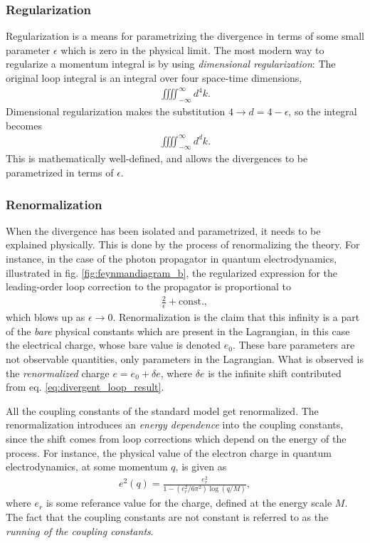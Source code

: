 \documentclass[twoside,english]{uiofysmaster}
\begin{document}
\subsubsection{Regularization}
Regularization is a means for parametrizing the divergence in terms of some small parameter $\epsilon$ which is zero in the physical limit. The most modern way to regularize a momentum integral is by using {\it dimensional regularization}: The original loop integral is an integral over four space-time dimensions, 
\begin{align}
	\iiiint_{-\infty}^\infty d^4 k.
\end{align}
Dimensional regularization makes the substitution $4 \to d = 4-\epsilon$, so the integral becomes
\begin{align}
	\iiiint_{-\infty}^\infty d^d k.
\end{align}
This is mathematically well-defined, and allows the divergences to be parametrized in terms of $\epsilon$.
\subsubsection{Renormalization}
When the divergence has been isolated and parametrized, it needs to be explained physically. This is done by the process of renormalizing the theory. For instance, in the case of the photon propagator in quantum electrodynamics, illustrated in fig. \ref{fig:feynmandiagram_b}, the regularized expression for the leading-order loop correction to the propagator is proportional to
\begin{align}
	\frac{2}{\epsilon} + \mathrm{const.}, \label{eq:divergent_loop_result}
\end{align}
which blows up as $\epsilon\to 0$. Renormalization is the claim that this infinity is a part of the {\it bare} physical constants which are present in the Lagrangian, in this case the electrical charge, whose bare value is denoted $e_0$. These bare parameters are not observable quantities, only parameters in the Lagrangian. What is observed is the {\it renormalized} charge $e = e_0 + \delta e$, where $\delta e$ is the infinite shift contributed from eq. \eqref{eq:divergent_loop_result}.

All the coupling constants of the standard model get renormalized. The renormalization introduces an {\it energy dependence} into the coupling constants, since the shift comes from loop corrections which depend on the energy of the process. For instance, the physical value of the electron charge in quantum electrodynamics, at some momentum $q$, is given as
\begin{align}
	e^2(q) = \frac{e_r^2}{1 - (e_r^2/6\pi^2)\log(q/M)},\label{eq:electron_charge_running}
\end{align}
where $e_r$ is some referance value for the charge, defined at the energy scale $M$. The fact that the coupling constants are not constant is referred to as the {\it running of the coupling constants}.
\end{document}
